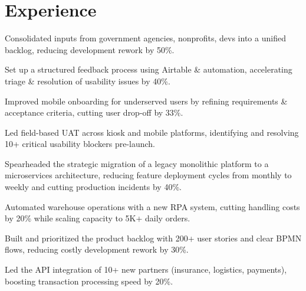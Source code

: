 \documentclass[]{deedy-resume-reversed}
\begin{document}
%
%


%
%

\begin{minipage}[t]{0.60\textwidth}


\section{Experience}

\vspace{\topsep}
\begin{tightemize}
\item Consolidated inputs from government agencies, nonprofits, devs into a unified backlog, reducing development rework by 50\%.
\item Set up a structured feedback process using Airtable \& automation, accelerating triage \& resolution of usability issues by 40\%.
\item Improved mobile onboarding for underserved users by refining requirements \&  acceptance criteria, cutting user drop-off by 33\%.
\item Led field-based UAT across kiosk and mobile platforms, identifying and resolving 10+ critical usability blockers pre-launch.
\end{tightemize}
\sectionsep

\begin{tightemize}
\item Spearheaded the strategic migration of a legacy monolithic platform to a microservices architecture, reducing feature deployment cycles from monthly to weekly and cutting production incidents by 40\%.
\item Automated warehouse operations with a new RPA system, cutting handling costs by 20\% while scaling capacity to 5K+ daily orders.
\item Built and prioritized the product backlog with 200+ user stories and clear BPMN flows, reducing costly development rework by 30\%.
\item Led the API integration of 10+ new partners (insurance, logistics, payments), boosting transaction processing speed by 20\%.
\end{tightemize}
\sectionsep


\end{minipage}
\end{document}
